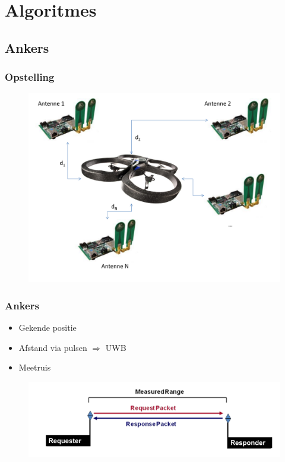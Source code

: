 \documentclass{beamer}
\begin{document}
\section{Algoritmes}
\subsection{Ankers}
  \begin{frame}
    \frametitle{Opstelling}
    \begin{figure}
      \begin{center}
        \includegraphics[width=.8\textwidth]{images/opstelling.pdf}
      \end{center}
    \end{figure}
  \end{frame}
  
  \begin{frame}
    \frametitle{Ankers}
    \begin{itemize}
      \item Gekende positie
      \item Afstand via pulsen $\Rightarrow$ UWB
      \item Meetruis
    \end{itemize}
    \begin{figure}
      \begin{center}
        \includegraphics[width=.8\textwidth]{images/DME.png}
      \end{center}
    \end{figure}
  \end{frame}
\end{document}
